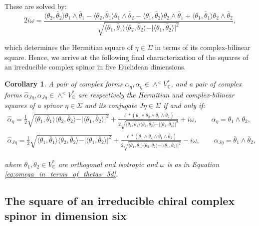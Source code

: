 \documentclass[10pt,a4paper,twoside,reqno]{amsart}
\theoremstyle{plain}
\newtheorem{cor}[thm]{Corollary}
\theoremstyle{definition}
\theoremstyle{remark}
\def\C{\mathbb{C}}
\newcommand{\escal}[1]{\langle#1\rangle}
\begin{document}
These are solved by:
\begin{equation}
\label{eq:omega_in_terms_of_thetas_5d}
2i\omega=\frac{\escal{\theta_2,\bar\theta_2}\theta_1\wedge\bar\theta_1-\escal{\theta_2,\bar\theta_1}\theta_1\wedge\bar\theta_2-\escal{\theta_1,\bar\theta_2}\theta_2\wedge\bar\theta_1+\escal{\theta_1,\bar\theta_1}\theta_2\wedge\bar\theta_2}{\sqrt{\escal{\theta_1,\bar\theta_1}\escal{\theta_2,\bar\theta_2}-\vert\escal{\theta_1,\bar\theta_2}\vert^2}},
\end{equation}

\noindent
which determines the Hermitian square of $\eta\in\Sigma$ in terms of its complex-bilinear square. Hence, we arrive at the following final characterization of the squares of an irreducible complex spinor in five Euclidean dimensions.

\begin{cor}
A pair of complex forms $\widehat{\alpha}_\eta, \alpha_\eta \in \wedge^< V^{\ast}_{\mathbb{C}}$, and a pair of complex forms $\widehat{\alpha}_{J\eta}, \alpha_{J\eta} \in \wedge^< V^{\ast}_{\mathbb{C}}$ are respectively the Hermitian and complex-bilinear squares of a spinor $\eta\in\Sigma$ and its conjugate $J\eta\in\Sigma$ if and only if:
\begin{gather*}
\widehat{\alpha}_\eta=\frac{1}{2}\sqrt{\escal{\theta_1,\bar\theta_1}\escal{\theta_2,\bar\theta_2}-\vert\escal{\theta_1,\bar\theta_2}\vert^2}+\frac{\ell*(\theta_1\wedge\theta_2\wedge\bar\theta_1\wedge\bar\theta_2)}{2\sqrt{\escal{\theta_1,\bar\theta_1}\escal{\theta_2,\bar\theta_2}-\vert\escal{\theta_1,\bar\theta_2}\vert^2}}+i\omega,\qquad \alpha_\eta=\theta_1\wedge\theta_2,\\
\widehat{\alpha}_{J\eta}=\frac{1}{2}\sqrt{\escal{\theta_1,\bar\theta_1}\escal{\theta_2,\bar\theta_2}-\vert\escal{\theta_1,\bar\theta_2}\vert^2}+\frac{\ell*(\theta_1\wedge\theta_2\wedge\bar\theta_1\wedge\bar\theta_2)}{2\sqrt{\escal{\theta_1,\bar\theta_1}\escal{\theta_2,\bar\theta_2}-\vert\escal{\theta_1,\bar\theta_2}\vert^2}}-i\omega,\qquad \alpha_{J\eta}=\bar\theta_1\wedge\bar\theta_2,
\end{gather*}

\noindent
where $\theta_1 , \theta_2 \in V^*_\C$ are orthogonal and isotropic and $\omega$ is as in Equation \eqref{eq:omega_in_terms_of_thetas_5d}.
\end{cor}


\subsection{The square of an irreducible chiral complex spinor in dimension six}
\end{document}
